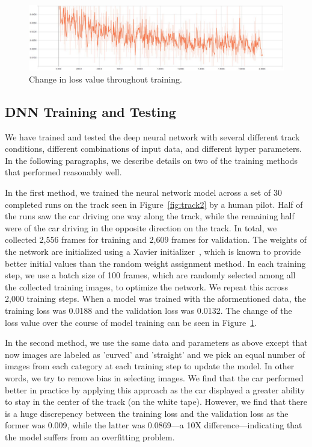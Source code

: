 \begin{figure}[h]
  \centering
  \includegraphics[width=.9\textwidth]{figs/TrainingLoss}
  \caption{Change in loss value throughout training.}
  \label{fig:modelloss}
\end{figure}

\subsection{DNN Training and Testing}
We have trained and tested the deep neural network with several
different track conditions, different combinations of input
data, and different hyper parameters. In the following paragraphs, we 
describe details on two of the training methods that performed 
reasonably well.

In the first method, we trained the neural network model across a set 
of 30 completed runs on the track seen in Figure~\ref{fig:track2} by a
human pilot. Half of the runs saw the car driving one way along the
track, while the remaining half were of the car driving in the
opposite direction on the track.
In total, we collected 2,556 frames for training and 2,609 
frames for validation.
The weights of the network are initialized using a Xavier
initializer~\cite{Glorot2010}, which is known to provide better
initial values than the random weight assignment method.
In each training step, we use a batch
size of 100 frames, which are randomly selected among all the
collected training images, to optimize the network.
We repeat this across 2,000 training steps. When a model was trained
with the  aformentioned data, the training loss was 0.0188 and the
validation  loss was 0.0132.
The change of the loss value over the course of model training can be
seen in Figure~\ref{fig:modelloss}.

In the second method, we use the same data and parameters as  above 
except that now images are labeled as 'curved' and 'straight' and we pick an
equal number of images from each category at each training step to
update the model. In other words, we try to remove bias in selecting
images. We find that the car performed better in practice by applying
this approach as the car displayed a greater ability to stay in the
center of the track (on the white tape).
However, we find that there is a huge discrepency between the training
loss and the validation loss as the former was 0.009, while the latter
was 0.0869---a 10X difference---indicating that the model suffers from
an overfitting problem.

